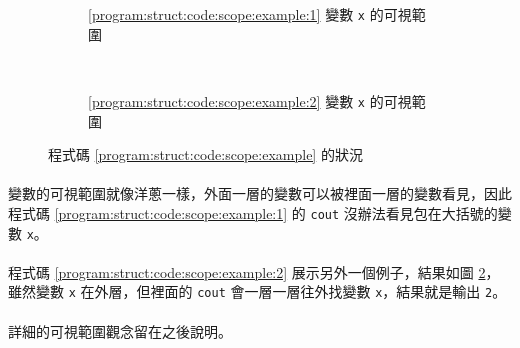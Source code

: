 \documentclass[12pt,a4paper,oneside]{report}
\begin{document}
\begin{CJK}{UTF8}{bkai}
\begin{figure}[h!]
\centering
\begin{subfigure}{.35\textwidth}
  \centering
  \caption{\ref{program:struct:code:scope:example:1} 變數 \lstinline!x! 的可視範圍}
  \label{program:struct:fig:scope:example:1}
\end{subfigure}
~
\begin{subfigure}{.35\textwidth}
  \centering
  \caption{\ref{program:struct:code:scope:example:2} 變數 \lstinline!x! 的可視範圍}
  \label{program:struct:fig:scope:example:2}
\end{subfigure}
\caption{程式碼 \ref{program:struct:code:scope:example} 的狀況}
\label{program:struct:fig:scope:example}
\end{figure}

\paragraph{}變數的可視範圍就像洋蔥一樣，外面一層的變數可以被裡面一層的變數看見，因此程式碼 \ref{program:struct:code:scope:example:1} 的 \lstinline!cout! 沒辦法看見包在大括號的變數 \lstinline!x!。

\paragraph{}程式碼 \ref{program:struct:code:scope:example:2} 展示另外一個例子，結果如圖 \ref{program:struct:fig:scope:example:2}，雖然變數 \lstinline!x! 在外層，但裡面的 \lstinline!cout! 會一層一層往外找變數 \lstinline!x!，結果就是輸出 \lstinline!2!。

\paragraph{}詳細的可視範圍觀念留在之後說明。


\end{CJK}
\end{document}
